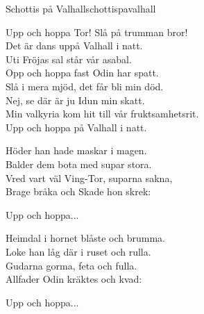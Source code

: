 \begin{song}{Schottis på Valhall}{schottispavalhall}
\begin{vers}
Upp och hoppa Tor! Slå på trumman bror!\\
Det är dans uppå Valhall i natt.\\
Uti Fröjas sal står vår asabal.\\
Opp och hoppa fast Odin har spatt.\\
Slå i mera mjöd, det får bli min död.\\
Nej, se där är ju Idun min skatt.\\
Min valkyria kom hit till vår fruktsamhetsrit.\\
Upp och hoppa på Valhall i natt.\\
\end{vers}
\begin{vers}
Höder han hade maskar i magen.\\
Balder dem bota med supar stora.\\
Vred vart väl Ving-Tor, suparna sakna,\\
Brage bråka och Skade hon skrek:\\
\end{vers}
\begin{vers}
Upp och hoppa...\\
\end{vers}
\begin{vers}
Heimdal i hornet blåste och brumma.\\
Loke han låg där i ruset och rulla.\\
Gudarna gorma, feta och fulla.\\
Allfader Odin kräktes och kvad:\\
\end{vers}
\begin{vers}
Upp och hoppa...\\
\end{vers}
\end{song}

